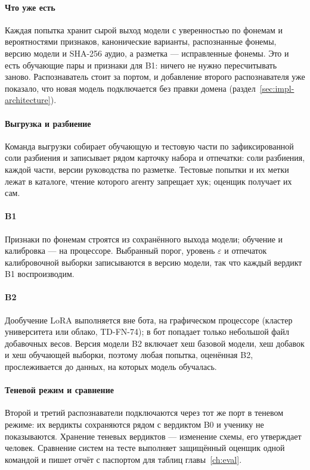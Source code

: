 \paragraph{Что уже есть} Каждая попытка хранит сырой выход модели с уверенностью по фонемам и
вероятностями признаков, канонические варианты, распознанные фонемы, версию модели и SHA-256 аудио, а
разметка --- исправленные фонемы. Это и есть обучающие пары и признаки для B1: ничего не нужно
пересчитывать заново. Распознаватель стоит за портом, и добавление второго распознавателя уже показало,
что новая модель подключается без правки домена (раздел~\ref{sec:impl-architecture}).

\paragraph{Выгрузка и разбиение} Команда выгрузки собирает обучающую и тестовую части по зафиксированной
соли разбиения и записывает рядом карточку набора \cite{SRC-123} и отпечатки: соли разбиения,
каждой части, версии руководства по разметке. Тестовые попытки и их метки лежат в каталоге, чтение которого
агенту запрещает хук; оценщик получает их сам.

\paragraph{B1} Признаки по фонемам строятся из сохранённого выхода модели; обучение и калибровка --- на
процессоре. Выбранный порог, уровень $\varepsilon$ и отпечаток калибровочной выборки записываются в версию
модели, так что каждый вердикт B1 воспроизводим.

\paragraph{B2} Дообучение LoRA выполняется вне бота, на графическом процессоре (кластер университета или
облако, TD-FN-74); в бот попадает только небольшой файл добавочных весов. Версия модели B2 включает хеш
базовой модели, хеш добавок и хеш обучающей выборки, поэтому любая попытка, оценённая B2, прослеживается до
данных, на которых модель обучалась.

\paragraph{Теневой режим и сравнение} Второй и третий распознаватели подключаются через тот же порт в
теневом режиме: их вердикты сохраняются рядом с вердиктом B0 и ученику не показываются. Хранение теневых
вердиктов --- изменение схемы, его утверждает человек. Сравнение систем на тесте выполняет защищённый
оценщик одной командой и пишет отчёт с паспортом для таблиц главы~\ref{ch:eval}.

